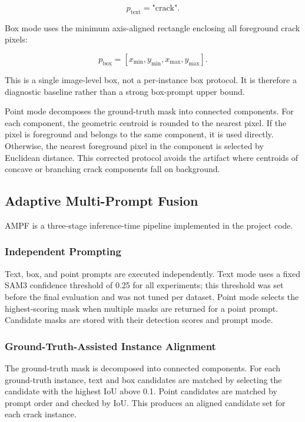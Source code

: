 \documentclass[applsci,article,submit,pdftex,moreauthors]{Definitions/mdpi}
\begin{document}
\[
p_{\text{text}} = \text{"crack"}.
\]

Box mode uses the minimum axis-aligned rectangle enclosing all
foreground crack pixels:

\[
p_{\text{box}} = [x_{\min}, y_{\min}, x_{\max}, y_{\max}].
\]

This is a single image-level box, not a per-instance box protocol. It is
therefore a diagnostic baseline rather than a strong box-prompt upper
bound.

Point mode decomposes the ground-truth mask into connected components.
For each component, the geometric centroid is rounded to the nearest
pixel. If the pixel is foreground and belongs to the same component, it
is used directly. Otherwise, the nearest foreground pixel in the
component is selected by Euclidean distance. This corrected protocol
avoids the artifact where centroids of concave or branching crack
components fall on background.

\subsection{Adaptive Multi-Prompt Fusion}

AMPF is a three-stage inference-time pipeline implemented in the project
code.

\subsubsection{Independent Prompting}

Text, box, and point prompts are executed independently. Text mode uses
a fixed SAM3 confidence threshold of 0.25 for all experiments; this
threshold was set before the final evaluation and was not tuned per
dataset. Point mode selects the highest-scoring mask when multiple masks
are returned for a point prompt. Candidate masks are stored with their
detection scores and prompt mode.

\subsubsection{Ground-Truth-Assisted Instance Alignment}

The ground-truth mask is decomposed into connected components. For each
ground-truth instance, text and box candidates are matched by selecting
the candidate with the highest IoU above 0.1. Point candidates are
matched by prompt order and checked by IoU. This produces an aligned
candidate set for each crack instance.
\end{document}
